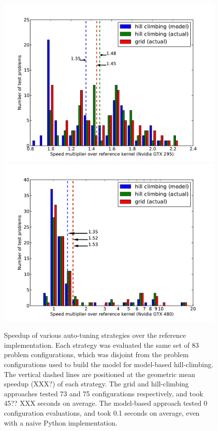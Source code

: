 \begin{figure}
\centering
\includegraphics[scale=.42]{speedup_295.pdf}
\includegraphics[scale=.42]{speedup_480.pdf}
\caption{
Speedup of various auto-tuning strategies over the reference
implementation.  Each strategy was evaluated the same set of 83 problem
configurations, which was disjoint from the problem configurations used
to build the model for model-based hill-climbing.  The vertical dashed
lines are positioned at the geometric mean speedup (XXX?) of each
strategy. The grid and hill-climbing approaches tested 73 and 75
configurations respectively, and took 45?? XXX seconds on average.
The model-based approach tested 0 configuration evaluations, and took 0.1
seconds on average, even with a naive Python implementation.
}
\label{fig:speedup}
\end{figure}


